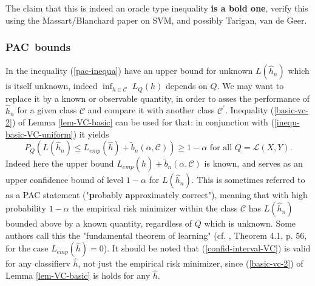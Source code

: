 \documentclass[11pt,twoside]{article}%
\theoremstyle{change}
\newenvironment{quote-env}{\begin{quote}\sffamily }{\end{quote}}
\newenvironment{mycomments-env}[1][Mycomments]{\textbf{#1.} \begin{quote-env} }{ \end{quote-env}  \ \rule{0.5em}{0.5em}}
\begin{document}
\begin{mycomments}%


\begin{mycomments-env}
The claim that this is indeed an oracle type inequality \textbf{is a bold
one}, verify this using the Massart/Blanchard paper on SVM, and possibly
Tarigan, van de Geer.
\end{mycomments-env}%

\end{mycomments}%


\bigskip

\subsubsection{PAC\ bounds}

In the inequality (\ref{pac-inequa}) have an upper bound for unknown
$L(\hat{h}_{n})$ which is itself unknown, indeed $\inf_{h\in\mathcal{C}%
}\;L_{Q}(h)$ depends on $Q$. We may want to replace it by a known or
observable quantity, in order to asses the performance of $\hat{h}_{n}$ for a
given class $\mathcal{C}$ and compare it with another class $\mathcal{C}%
^{\prime}$. Inequality (\ref{basic-vc-2}) of Lemma \ref{lem-VC-basic} can be
used for that: in conjunction with (\ref{inequ-basic-VC-uniform}) it yields
\begin{equation}
P_{Q}\left(  L(\hat{h}_{n})\leq L_{emp}(\hat{h})+\tilde{b}_{n}(\alpha
,\mathcal{C})\right)  \geq1-\alpha\text{ for all }Q=\mathcal{L}\left(
X,Y\right)  .\label{confid-interval-VC}%
\end{equation}
Indeed here the upper bound $L_{emp}(\hat{h})+\tilde{b}_{n}(\alpha
,\mathcal{C})$ is known, and serves as an upper confidence bound of level
$1-\alpha$ for $L(\hat{h}_{n})$. This is sometimes referred to as a PAC
statement ("\textbf{p}robably \textbf{a}pproximately \textbf{c}orrect"),
meaning that with high probability $1-\alpha$ the empirical risk minimizer
within the class $\mathcal{C}$ has $L(\hat{h}_{n})$ bounded above by a known
quantity, regardless of $Q$ which is unknown. Some authors call this the
"fundamental theorem of learning" (cf. \cite{CST}, Theorem 4.1, p. 56, for the
case $L_{emp}(\hat{h})=0$). It should be noted that (\ref{confid-interval-VC})
is valid for any classifierv $\hat{h}$, not just the empirical risk minimizer,
since (\ref{basic-vc-2}) of Lemma \ref{lem-VC-basic} is holds for any $\hat
{h}.$
\end{document}
